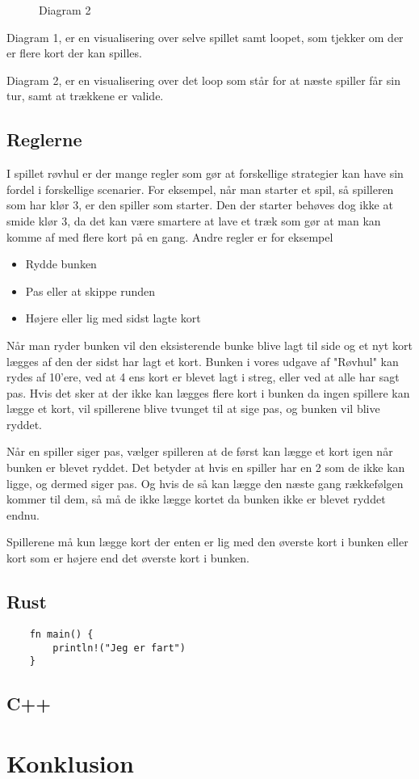 \documentclass[a4paper, 12pt]{article}
\begin{document}
\begin{figure}[H]
	\centering
	
	\caption{Diagram 2}
\end{figure}

Diagram 1, er en visualisering over selve spillet samt loopet, som tjekker om der er flere kort der kan spilles.
\bigbreak

Diagram 2, er en visualisering over det loop som står for at næste spiller får sin tur, samt at trækkene er valide.

\vfill
\pagebreak


\subsection{Reglerne}
I spillet røvhul er der mange regler som gør at forskellige strategier kan have sin fordel i forskellige scenarier. For eksempel, når man starter et spil, så spilleren som har klør 3, er den spiller som starter. Den der starter behøves dog ikke at smide klør 3, da det kan være smartere at lave et træk som gør at man kan komme af med flere kort på en gang. Andre regler er for eksempel

\begin{itemize}
	\item Rydde bunken
	\item Pas eller at skippe runden
	\item Højere eller lig med sidst lagte kort
\end{itemize}

Når man ryder bunken vil den eksisterende bunke blive lagt til side og et nyt kort lægges af den der sidst har lagt et kort. Bunken i vores udgave af "Røvhul" kan rydes af 10'ere, ved at 4 ens kort er blevet lagt i streg, eller ved at alle har sagt pas. Hvis det sker at der ikke kan lægges flere kort i bunken da ingen spillere kan lægge et kort, vil spillerene blive tvunget til at sige pas, og bunken vil blive ryddet.

Når en spiller siger pas, vælger spilleren at de først kan lægge et kort igen når bunken er blevet ryddet. Det betyder at hvis en spiller har en 2 som de ikke kan ligge, og dermed siger pas. Og hvis de så kan lægge den næste gang rækkefølgen kommer til dem, så må de ikke lægge kortet da bunken ikke er blevet ryddet endnu.

Spillerene må kun lægge kort der enten er lig med den øverste kort i bunken eller kort som er højere end det øverste kort i bunken.

\subsection{Rust}


\begin{verbatim}
	fn main() {
		println!("Jeg er fart")
	}
\end{verbatim}


\subsection{C++}



\vfill
\pagebreak

\section{Konklusion}

\vfill
\pagebreak
\end{document}
